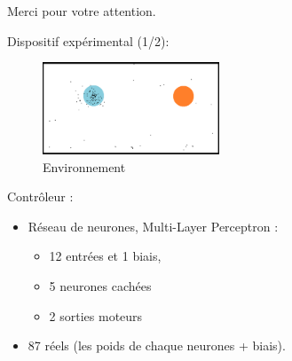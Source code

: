 \documentclass[8pt, handout=show,notes=show]{beamer}
\begin{document}
	\begin{frame}%
	\begin{center}
	Merci pour votre attention.
	\end{center}
	\end{frame}
	
	\begin{frame}{Dispositif expérimental (1/2):}\addtocounter{framenumber}{-1}
	\vfill
	\begin{figure}
	\includegraphics[height=2.75cm]{images/1roborob_sp_201106}
	\caption{Environnement}
	\end{figure}
	\vfill
	\begin{block}{Contrôleur :}
	\begin{itemize}
	\item Réseau de neurones, Multi-Layer Perceptron : 
	\begin{itemize}
	 \item 12 entrées et 1 biais,
	 \item 5 neurones cachées
	 \item 2 sorties moteurs
	\end{itemize}
	\item 87 réels (les poids de chaque neurones + biais).
	\end{itemize}
	\end{block}
	
	
	\vfill
	\end{frame}
	
\end{document}
